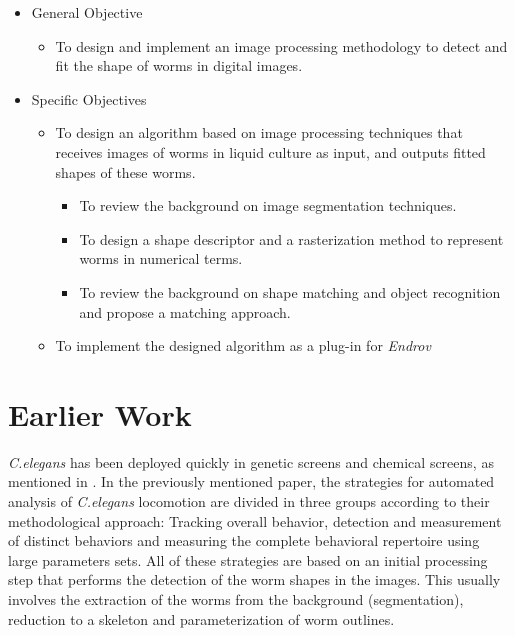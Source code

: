 \begin{itemize}
\item General Objective
  \begin{itemize}
  \item To design and implement an image processing methodology to detect
    and fit the shape of worms in digital images.    
  \end{itemize}
\end{itemize}
\begin{itemize}
\item Specific Objectives
  \begin{itemize}
  \item To design an algorithm based on image processing techniques that
    receives images of worms in liquid culture as input, and outputs
    fitted shapes of these worms.
    \begin{itemize}
    \item To review the background on image segmentation techniques.    
    \item To design a shape descriptor and a rasterization method to
      represent worms in numerical terms.
    \item To review the background on shape matching and object recognition and
      propose a matching approach.    
    \end{itemize}
  \item To implement the designed algorithm as a plug-in for \emph{Endrov}
  \end{itemize}
\end{itemize}

\section{Earlier Work}

\emph{C.elegans} has been deployed quickly in genetic screens and chemical
screens, as mentioned in \cite{automated}. In the previously mentioned paper,
the strategies for automated analysis of \emph{C.elegans} locomotion are
divided in three groups according to their methodological approach:
Tracking overall behavior, detection and measurement of distinct behaviors and
measuring the complete behavioral repertoire using large parameters sets.
All of these strategies are based on an initial processing step that performs the detection of the worm shapes in the images. This usually involves the extraction of the worms from the background (segmentation), reduction to a skeleton and parameterization of worm outlines.

